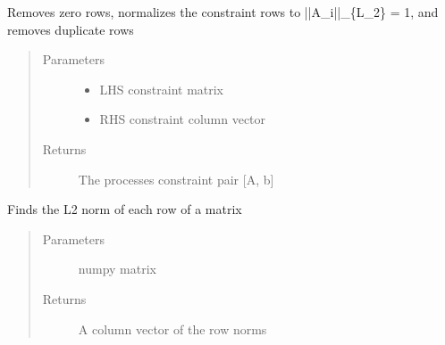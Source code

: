 \documentclass[letterpaper,10pt,english]{sphinxmanual}
\begin{document}
\begin{fulllineitems}
\label{\detokenize{mpo.utils:mpo.utils.constraint_utilities.cheap_remove_redundant_constraints}}
\sphinxAtStartPar
Removes zero rows, normalizes the constraint rows to ||A\_i||\_\{L\_2\} = 1, and removes duplicate rows
\begin{quote}\begin{description}
\item[{Parameters}] \leavevmode\begin{itemize}
\item {} 
\sphinxAtStartPar
{} \textendash{} LHS constraint matrix

\item {} 
\sphinxAtStartPar
{} \textendash{} RHS constraint column vector

\end{itemize}

\item[{Returns}] \leavevmode
\sphinxAtStartPar
The processes constraint pair {[}A, b{]}

\end{description}\end{quote}

\end{fulllineitems}


\begin{fulllineitems}
\label{\detokenize{mpo.utils:mpo.utils.constraint_utilities.constraint_norm}}
\sphinxAtStartPar
Finds the L2 norm of each row of a matrix
\begin{quote}\begin{description}
\item[{Parameters}] \leavevmode
\sphinxAtStartPar
{} \textendash{} numpy matrix

\item[{Returns}] \leavevmode
\sphinxAtStartPar
A column vector of the row norms

\end{description}\end{quote}

\end{fulllineitems}
\end{document}
